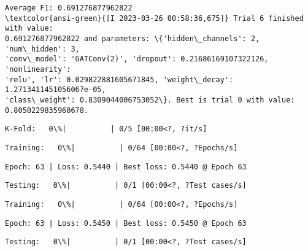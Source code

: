 \documentclass[11pt]{article}
\begin{document}
    
    \begin{Verbatim}[commandchars=\\\{\}]
Average F1: 0.691276877962822
\textcolor{ansi-green}{[I 2023-03-26 00:58:36,675]} Trial 6 finished with value:
0.691276877962822 and parameters: \{'hidden\_channels': 2, 'num\_hidden': 3,
'conv\_model': 'GATConv(2)', 'dropout': 0.21686169107322126, 'nonlinearity':
'relu', 'lr': 0.029822881605671845, 'weight\_decay': 1.2713411451056067e-05,
'class\_weight': 0.8309044006753052\}. Best is trial 0 with value:
0.8050229835960678.
    \end{Verbatim}

    
    \begin{Verbatim}[commandchars=\\\{\}]
K-Fold:   0\%|          | 0/5 [00:00<?, ?it/s]
    \end{Verbatim}

    
    
    \begin{Verbatim}[commandchars=\\\{\}]
Training:   0\%|          | 0/64 [00:00<?, ?Epochs/s]
    \end{Verbatim}

    
    \begin{Verbatim}[commandchars=\\\{\}]
Epoch: 63 | Loss: 0.5440 | Best loss: 0.5440 @ Epoch 63
    \end{Verbatim}

    
    \begin{Verbatim}[commandchars=\\\{\}]
Testing:   0\%|          | 0/1 [00:00<?, ?Test cases/s]
    \end{Verbatim}

    
    
    \begin{Verbatim}[commandchars=\\\{\}]
Training:   0\%|          | 0/64 [00:00<?, ?Epochs/s]
    \end{Verbatim}

    
    \begin{Verbatim}[commandchars=\\\{\}]
Epoch: 63 | Loss: 0.5450 | Best loss: 0.5450 @ Epoch 63
    \end{Verbatim}

    
    \begin{Verbatim}[commandchars=\\\{\}]
Testing:   0\%|          | 0/1 [00:00<?, ?Test cases/s]
    \end{Verbatim}
\end{document}
